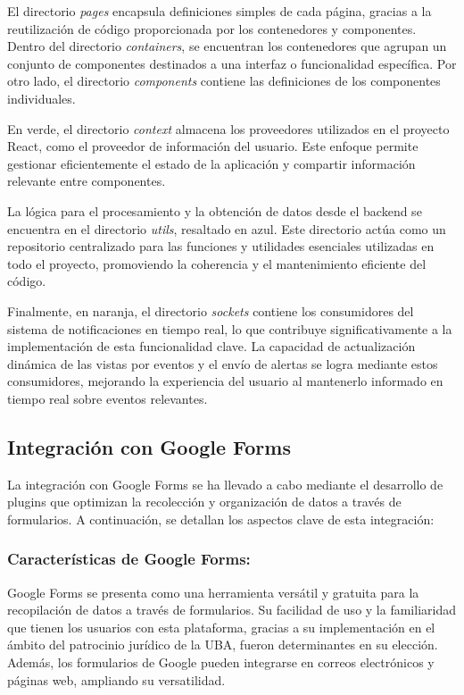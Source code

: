 El directorio \textit{pages} encapsula definiciones simples de cada página, gracias a la reutilización de código proporcionada por los contenedores y componentes. Dentro del directorio \textit{containers}, se encuentran los contenedores que agrupan un conjunto de componentes destinados a una interfaz o funcionalidad específica. Por otro lado, el directorio \textit{components} contiene las definiciones de los componentes individuales.

En verde, el directorio \textit{context} almacena los proveedores utilizados en el proyecto React, como el proveedor de información del usuario. Este enfoque permite gestionar eficientemente el estado de la aplicación y compartir información relevante entre componentes.

La lógica para el procesamiento y la obtención de datos desde el backend se encuentra en el directorio \textit{utils}, resaltado en azul. Este directorio actúa como un repositorio centralizado para las funciones y utilidades esenciales utilizadas en todo el proyecto, promoviendo la coherencia y el mantenimiento eficiente del código.

Finalmente, en naranja, el directorio \textit{sockets} contiene los consumidores del sistema de notificaciones en tiempo real, lo que contribuye significativamente a la implementación de esta funcionalidad clave. La capacidad de actualización dinámica de las vistas por eventos y el envío de alertas se logra mediante estos consumidores, mejorando la experiencia del usuario al mantenerlo informado en tiempo real sobre eventos relevantes.



\subsection{Integración con Google Forms}\label{subsec:integracion-google-form}

La integración con Google Forms se ha llevado a cabo mediante el desarrollo de plugins que optimizan la recolección y organización de datos a través de formularios. A continuación, se detallan los aspectos clave de esta integración:

\subsubsection{Características de Google Forms:}
Google Forms se presenta como una herramienta versátil y gratuita para la recopilación de datos a través de formularios. Su facilidad de uso y la familiaridad que tienen los usuarios con esta plataforma, gracias a su implementación en el ámbito del patrocinio jurídico de la UBA, fueron determinantes en su elección. Además, los formularios de Google pueden integrarse en correos electrónicos y páginas web, ampliando su versatilidad.


